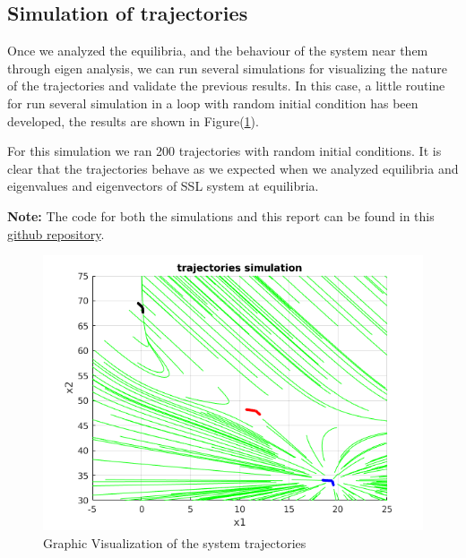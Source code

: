 \documentclass[12pt,letterpaper]{article}
\begin{document}
\subsection{Simulation of trajectories}
Once we analyzed the equilibria, and the behaviour of the system near them through eigen analysis, we can run several simulations 
for visualizing the nature of the trajectories and validate the previous results. In this case, a little routine for run 
several simulation in a loop with random initial condition has been developed, the results are shown in Figure(\ref{fig:trajectories}).

For this simulation we ran 200 trajectories with random initial conditions. It is clear that the trajectories behave as we expected 
when we analyzed equilibria and eigenvalues and eigenvectors of SSL system at equilibria. 

\textbf{Note:} The code for both the simulations and this report can be found in this \href{https://github.com/tabris2015/non_linear_control_HW/tree/master/HW1}{github repository}. 


 
    
\begin{figure}[!h] 
    \centering
    \includegraphics[width=1.1\textwidth]{../matlab/img/trajectories.png}
    \caption{Graphic Visualization of the system trajectories}
        \label{fig:trajectories}
    \end{figure}
\end{document}
